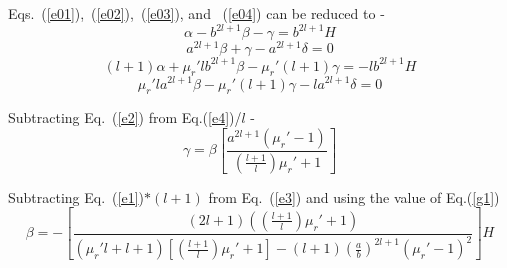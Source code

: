 Eqs.~(\ref{e01}),~(\ref{e02}),~(\ref{e03}), and ~(\ref{e04}) can be reduced to -
\begin{equation}\label{e1}
\alpha- b^{2l+1}\beta-\gamma=b^{2l+1}H
\end{equation}
\begin{equation}\label{e2}
 a^{2l+1}\beta+\gamma-a^{2l+1}\delta =0
\end{equation}
\begin{equation}\label{e3}
(l+1)\alpha+\mu_r' l b^{2l+1}\beta-\mu_r'(l+1)\gamma=-lb^{2l+1}H
\end{equation}
\begin{equation}\label{e4}
\mu_r'l a^{2l+1}\beta -\mu_r'(l+1)\gamma- l a^{2l+1}\delta=0
\end{equation}

Subtracting Eq.~(\ref{e2}) from Eq.(\ref{e4})/$l$ -
\begin{equation}\label{g1}
\gamma=\beta \left[\frac{a^{2l+1}(\mu_r'-1)}{\left(\frac{l+1}{l}\right)\mu_r'+1}\right]
\end{equation}

Subtracting Eq.~(\ref{e1})$*(l+1)$ from Eq.~(\ref{e3}) and using the value of Eq.(\ref{g1})
\begin{equation}\label{bt1}
\beta=-\left[\frac{(2l+1)\left(\left(\frac{l+1}{l}\right)\mu_r'+1\right)}{(\mu_r'l+l+1)\left[\left(\frac{l+1}{l}\right)\mu_r'+1\right]-(l+1)\left(\frac{a}{b}\right)^{2l+1}(\mu_r'-1)^2}\right]H
\end{equation}

